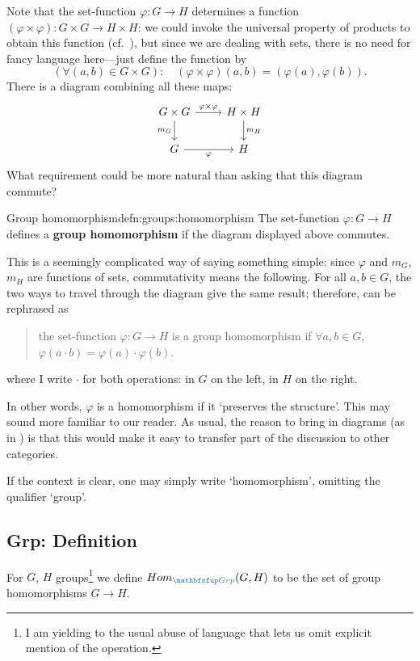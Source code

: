 Note that the set-function $\varphi : G \to H$ determines a function
$(\varphi \times \varphi) : G \times G \to H \times H$: we could
invoke the universal property of products to obtain this function
(cf.\ ), but since we are dealing with
sets, there is no need for fancy language here---just define the
function by
\[
  (\forall (a,b) \in G \times G) : \quad (\varphi \times \varphi)(a,b)
  = (\varphi(a), \varphi(b)).
\]
There is a diagram combining all these maps:
\[
  \begin{tikzcd}
    G \times G \arrow[r, "\varphi \times \varphi"] \arrow[d, "m_G"'] & H \times H \arrow[d, "m_H"] \\
    G \arrow[r, "\varphi"'] & H
  \end{tikzcd}
\]
What requirement could be more natural than asking that this diagram
commute?

\begin{defn}{Group homomorphism}{defn:groups:homomorphism}
  The set-function $\varphi : G \to H$ defines a \textbf{group
    homomorphism} if the diagram displayed above commutes.
\end{defn}

This is a seemingly complicated way of saying something simple: since
$\varphi$ and $m_G$, $m_H$ are functions of sets, commutativity means
the following. For all $a, b \in G$, the two ways to travel through
the diagram give the same result; therefore,
 can be rephrased as

\begin{quote}
  the set-function $\varphi : G \to H$ is a group homomorphism if
  $\forall a, b \in G$,
  $\varphi(a \cdot b) = \varphi(a) \cdot \varphi(b)$.
\end{quote}

where I write $\cdot$ for both operations: in $G$ on the left, in $H$
on the right.

In other words, $\varphi$ is a homomorphism if it `preserves the
structure'.  This may sound more familiar to our reader. As usual, the
reason to bring in diagrams (as in ) is
that this would make it easy to transfer part of the discussion to
other categories.

If the context is clear, one may simply write `homomorphism', omitting
the qualifier `group'.

\subsection{Grp: Definition}
\label{subsec:groups:grp-definition}
For $G$, $H$ groups\footnote{I am yielding to the usual abuse of
  language that lets us omit explicit mention of the operation.} we
define $\Hom_{\categ{Grp}}(G, H)$ to be the set of group homomorphisms
$G \to H$.


